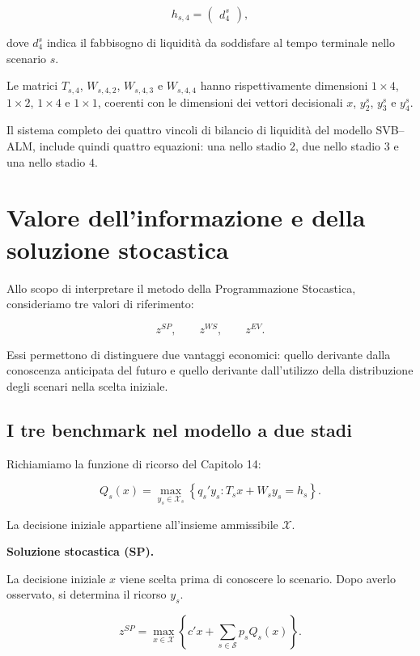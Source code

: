 \[
h_{s,4}
=
\begin{pmatrix}
d_4^s
\end{pmatrix},
\]

dove $d_4^s$ indica il fabbisogno
di liquidit\`a da soddisfare
al tempo terminale nello scenario $s$.

Le matrici $T_{s,4}$, $W_{s,4,2}$,
$W_{s,4,3}$ e $W_{s,4,4}$ hanno
rispettivamente dimensioni
$1\times4$, $1\times2$, $1\times4$
e $1\times1$, coerenti con
le dimensioni dei vettori decisionali
$x$, $y_2^s$, $y_3^s$ e $y_4^s$.

Il sistema completo
dei quattro vincoli di bilancio di liquidit\`a del modello SVB--ALM, include quindi quattro equazioni: una nello stadio $2$,
due nello stadio $3$ e una nello stadio $4$.


\section{Valore dell'informazione e della soluzione stocastica}

\label{sec:cap15-valore-informazione-v2}

Allo scopo di interpretare il metodo della Programmazione Stocastica, consideriamo tre valori di riferimento:

\[
z^{SP},\qquad z^{WS},\qquad z^{EV}.
\]

Essi permettono di distinguere due vantaggi economici:
quello derivante dalla conoscenza anticipata del futuro
e quello derivante dall'utilizzo della distribuzione
degli scenari nella scelta iniziale.


\subsection{I tre benchmark nel modello a due stadi}

Richiamiamo la funzione di ricorso del Capitolo 14:

\[
Q_s(x)
=
\max_{y_s\in\mathcal X_s}
\left\{
q_s'y_s:
T_sx+W_sy_s=h_s
\right\}.
\]

La decisione iniziale appartiene all'insieme
ammissibile $\mathcal X$.

\medskip

\noindent
\textbf{Soluzione stocastica (SP).}

La decisione iniziale $x$ viene scelta prima
di conoscere lo scenario. Dopo averlo osservato,
si determina il ricorso $y_s$.

\begin{equation}
z^{SP}
=
\max_{x\in\mathcal X}
\left\{
c'x+
\sum_{s\in\mathcal S}p_sQ_s(x)
\right\}.
\label{eq:cap15-sp-benchmark-v2}
\end{equation}

